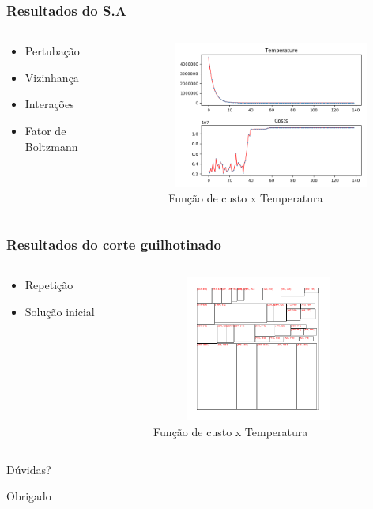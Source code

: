 \documentclass[aspectratio=169]{beamer}
\theoremstyle{Definition}
\begin{document}
\begin{frame}
	\frametitle{Resultados do S.A}
	
		\begin{columns}
		\begin{column}{0.5\textwidth}
		   \begin{itemize}
		   		\item Pertubação
				\item Vizinhança
				\item Interações
				\item Fator de Boltzmann
			\end{itemize}
		\end{column}
		\begin{column}{0.5\textwidth}  %
    		\begin{figure}[h]
	   	 		\includegraphics[width=7cm, height=4.8cm]{imagens/plot}
			    \caption{Função de custo x Temperatura}
	  		\end{figure}
		\end{column}
	\end{columns}
\end{frame}

\begin{frame}
	\frametitle{Resultados do corte guilhotinado}
	
		\begin{columns}
		\begin{column}{0.5\textwidth}
		   \begin{itemize}
		   		\item Repetição
				\item Solução inicial
			\end{itemize}
		\end{column}
		\begin{column}{0.5\textwidth}  %
    		\begin{figure}[h]
	   	 		\includegraphics[width=7cm, height=4.8cm]{imagens/cut}
			    \caption{Função de custo x Temperatura}
	  		\end{figure}
		\end{column}
	\end{columns}
\end{frame}

\begin{frame}
Dúvidas?
\end{frame}

\begin{frame}
Obrigado
\end{frame}
\end{document}
